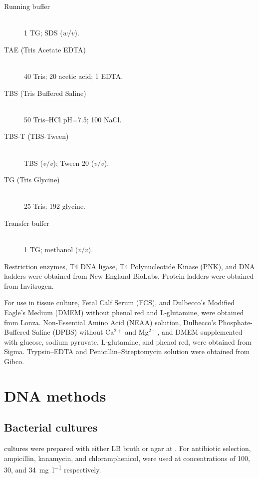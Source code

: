 \begin{table}
\begin{description}
    \item[Running buffer] \hfill \\
      \SI{1}{\X}  TG;
       SDS ($w/v$).

    \item[TAE (Tris Acetate EDTA)] \hfill \\
      \SI{40}{\mM} Tris;
      \SI{20}{\mM} acetic acid;
      \SI{1}{\mM}  EDTA.

    \item[TBS (Tris Buffered Saline)] \hfill \\
      \SI{50}{\mM} Tris--HCl pH=\num{7.5};
      \SI{100}{\mM}    NaCl.

    \item[TBS-T (TBS-Tween)] \hfill \\
       TBS ($v/v$);
        Tween 20 ($v/v$).

    \item[TG (Tris Glycine)] \hfill \\
      \SI{25}{\mM}  Tris;
      \SI{192}{\mM} glycine.

    \item[Transfer buffer] \hfill \\
      \SI{1}{\X} TG;
       methanol ($v/v$).
    \end{description}
  \end{table}

  Restriction enzymes, T4 DNA ligase, T4 Polynucleotide Kinase (PNK), and DNA
  ladders were obtained from New England BioLabs.
  Protein ladders were obtained from Invitrogen.

  For use in tissue culture, Fetal Calf Serum (FCS), and
  Dulbecco's Modified Eagle's Medium (DMEM) without phenol red and L-glutamine,
  were obtained from Lonza.  Non-Essential Amino Acid (NEAA) solution,
  Dulbecco's Phosphate-Buffered Saline (DPBS) without Ca$^{2+}$ and Mg$^{2+}$,
  and DMEM supplemented with glucose, sodium pyruvate, L-glutamine,
  and phenol red, were obtained from Sigma.
  Trypsin--EDTA and Penicillin--Streptomycin
  solution were obtained from Gibco.

  \section{DNA methods}
    \subsection{Bacterial cultures}
       cultures were prepared with either LB broth or agar
      at . For antibiotic selection, ampicillin, kanamycin, and
      chloramphenicol, were used at concentrations of 100, 30,
      and \SI{34}{\mg\per\l} respectively.

